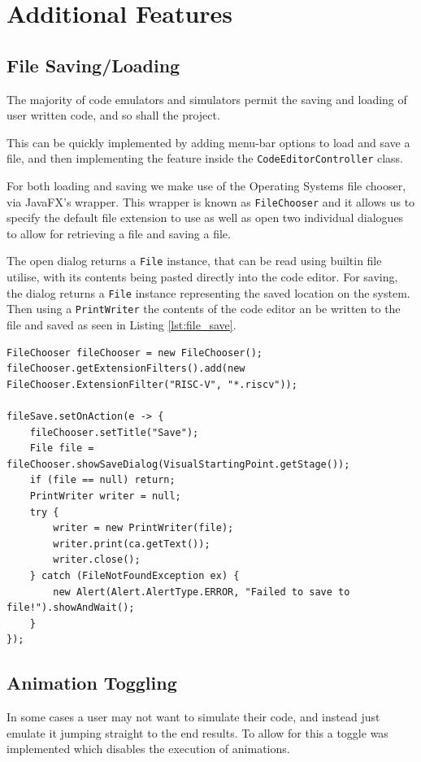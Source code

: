 \section{Additional Features}
\subsection{File Saving/Loading}
The majority of code emulators and simulators permit the saving and loading of user written code, and so shall the project.

This can be quickly implemented by adding menu-bar options to load and save a file, and then implementing the feature inside the \texttt{CodeEditorController} class.

For both loading and saving we make use of the Operating Systems file chooser, via JavaFX's \cite{sunmicrosystems_2022_javafx} wrapper. This wrapper is known as \texttt{FileChooser} and it allows us to specify the default file extension to use as well as open two individual dialogues to allow for retrieving a file and saving a file.

The open dialog returns a \texttt{File} instance, that can be read using builtin file utilise, with its contents being pasted directly into the code editor. For saving, the dialog returns a \texttt{File} instance representing the saved location on the system. Then using a \texttt{PrintWriter} the contents of the code editor an be written to the file and saved as seen in Listing \ref{lst:file_save}.

\begin{lstlisting}[caption=File saving implementation using \texttt{FileChooser}, label=lst:file_save]
FileChooser fileChooser = new FileChooser();
fileChooser.getExtensionFilters().add(new FileChooser.ExtensionFilter("RISC-V", "*.riscv"));

fileSave.setOnAction(e -> {
    fileChooser.setTitle("Save");
    File file = fileChooser.showSaveDialog(VisualStartingPoint.getStage());
    if (file == null) return;
    PrintWriter writer = null;
    try {
        writer = new PrintWriter(file);
        writer.print(ca.getText());
        writer.close();
    } catch (FileNotFoundException ex) {
        new Alert(Alert.AlertType.ERROR, "Failed to save to file!").showAndWait();
    }
});
\end{lstlisting}

\subsection{Animation Toggling}
In some cases a user may not want to simulate their code, and instead just emulate it jumping straight to the end results. To allow for this a toggle was implemented which disables the execution of animations.

